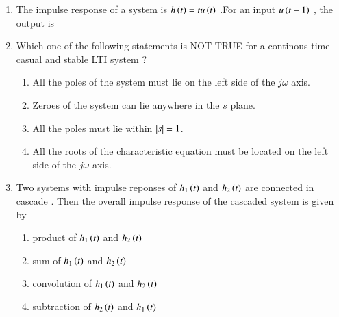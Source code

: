 \documentclass[journal]{IEEEtran}
\begin{document}
\begin{enumerate}
\begin{figure}[!ht]
{}
\label{fig:my_label}
\end{figure}
\begin{enumerate}
\end{enumerate}
\item The impulse response of a system is $h\left(t\right)=tu\left(t\right)$ .For an input $u\left(t-1\right)$ , the output is 
\begin{enumerate}
\end{enumerate}
\item Which one of the following statements is NOT TRUE for a continous time casual and stable LTI system ? 
\begin{enumerate}
\item All the poles of the system must lie on the left side of the $j\omega$ axis.
\item  Zeroes of the system can lie anywhere in the $s$ plane.
\item All the poles must lie within $\left\vert s\right\vert=1$.
\item All the roots of the characteristic equation must be located on the left side of the $j\omega$ axis.
\end{enumerate}
\item Two systems with impulse reponses of $h_1\left(t\right)$ and $h_2\left(t\right)$ are connected in cascade . Then the overall impulse response of the cascaded system is given by
\begin{enumerate}
\item product of $h_1\left(t\right)$ and $h_2\left(t\right)$  
\item sum of $h_1\left(t\right)$ and $h_2\left(t\right)$
\item convolution of $h_1\left(t\right)$ and $h_2\left(t\right)$ 
\item subtraction of $h_2\left(t\right)$ and $h_1\left(t\right)$ 

\end{enumerate}
\end{enumerate}
\end{document}
